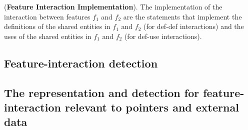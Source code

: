 \begin{Definition}{({\bf Feature Interaction Implementation}).} The implementation of the interaction between features $f_1$ and $f_2$ are the statements that implement the definitions of the shared entities in $f_1$ and $f_2$ (for def-def interactions) and the uses of the shared entities in $f_1$ and $f_2$ (for def-use interactions).
\end{Definition}
\subsection{Feature-interaction detection}

\subsection{The representation and detection for feature-interaction relevant to pointers and external data}